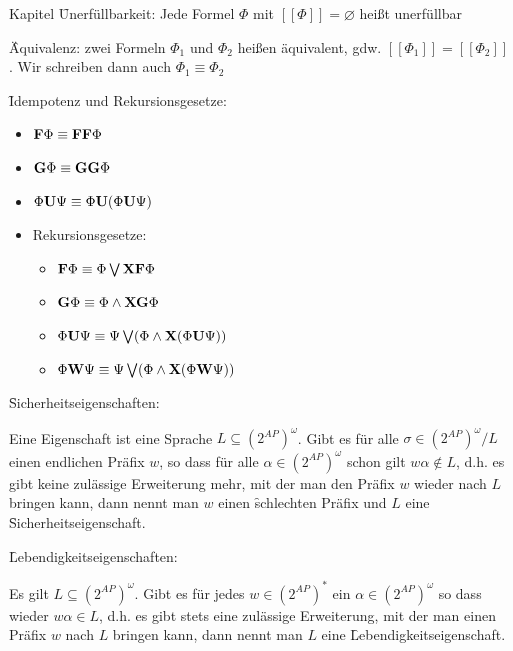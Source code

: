 \begin{chapter}{Kapitel}
\f{Unerfüllbarkeit}: Jede Formel $\Phi$ mit $[[\Phi]] = \varnothing$ heißt unerfüllbar
\vspace*{4pt}

\f{Äquivalenz}: zwei Formeln $\Phi_1$ und $\Phi_2$ heißen äquivalent, gdw. $[[\Phi_1]] = [[\Phi_2]]$. Wir schreiben dann auch $\Phi_1 \equiv \Phi_2$
\vspace*{6pt}

\f{Idempotenz und Rekursionsgesetze}:
\vspace*{5pt}

\begin{itemize}
 \item $\f{F}\Phi \equiv \f{FF}\Phi$
 \item $\f{G}\Phi \equiv \f{GG}\Phi$
 \item $\Phi\f{U}\Psi \equiv \Phi\f{U}(\Phi\f{U}\Psi)$
 \item Rekursionsgesetze:
 \begin{itemize}
  \item $\f{F}\Phi \equiv \Phi\bigvee\f{XF}\Phi$
  \item $\f{G}\Phi \equiv \Phi\wedge\f{XG}\Phi$
  \item $\Phi\f{U}\Psi \equiv \Psi\bigvee(\Phi\wedge\f{X}(\Phi\f{U}\Psi))$
  \item $\Phi\f{W}\Psi \equiv \Psi\bigvee(\Phi\wedge\f{X}(\Phi\f{W}\Psi))$
 \end{itemize}
\end{itemize}
\vspace*{5pt}

\f{Sicherheitseigenschaften}:
\vspace*{4pt}

\noindent Eine Eigenschaft ist eine Sprache $L \subseteq \left(2^{AP}\right)^\omega$. Gibt es für alle $\sigma \in \left(2^{AP}\right)^\omega/L$ einen endlichen Präfix $w$,
so dass für alle $\alpha \in \left(2^{AP}\right)^\omega$ schon gilt $w\alpha \notin L$, d.h. es gibt keine zulässige Erweiterung mehr, mit der man den Präfix $w$
wieder nach $L$ bringen kann, dann nennt man $w$ einen \f{schlechten Präfix} und $L$ eine \f{Sicherheitseigenschaft}.
\vspace*{6pt}

\f{Lebendigkeitseigenschaften}:
\vspace*{4pt}

\noindent Es gilt $L \subseteq \left(2^{AP}\right)^\omega$. Gibt es für jedes $w \in \left(2^{AP}\right)^*$ ein $\alpha \in \left(2^{AP}\right)^\omega$ so dass 
wieder $w\alpha \in L$, d.h. es gibt stets eine zulässige Erweiterung, mit der man einen Präfix $w$ nach $L$ bringen kann, dann nennt man $L$ eine 
\f{Lebendigkeitseigenschaft}.
\vspace*{5pt}


\end{chapter}
